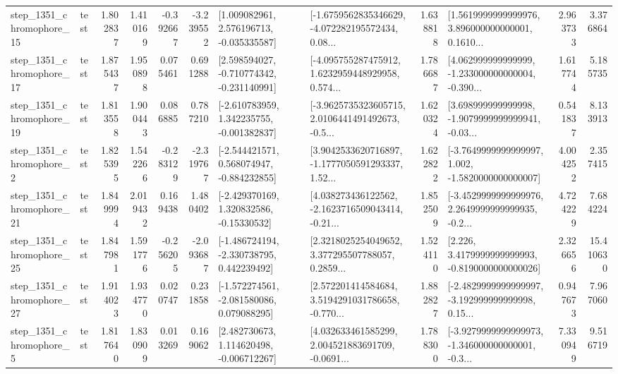 \begin{tabular}{llrrrrllrlrr}
 step\_1351\_chromophore\_15 &      test &      1.802837 &    1.410169 &     -0.392667 & -3.239552 &    [1.009082961, 2.576196713, -0.035335587] &  [-1.6759562835346629, -4.072282195572434, 0.08... &       1.638818 &  [1.5619999999999976, 3.896000000000001, 0.1610... &            2.963733 &          3.376864 \\
 step\_1351\_chromophore\_17 &      test &      1.875437 &    1.950898 &      0.075461 &  0.691288 &   [2.598594027, -0.710774342, -0.231140991] &  [-4.095755287475912, 1.6232959448929958, 0.574... &       1.786687 &  [4.062999999999999, -1.233000000000004, -0.390... &            1.617744 &          5.185735 \\
 step\_1351\_chromophore\_19 &      test &      1.813558 &    1.900443 &      0.086885 &  0.787210 &   [-2.610783959, 1.342235755, -0.001382837] &  [-3.9625735323605715, 2.0106441491492673, -0.5... &       1.620324 &  [3.698999999999998, -1.9079999999999941, -0.03... &            0.541837 &          8.133913 \\
  step\_1351\_chromophore\_2 &      test &      1.825395 &    1.542266 &     -0.283129 & -2.319767 &   [-2.544421571, 0.568074947, -0.884232855] &  [3.9042533620716897, -1.1777050591293337, 1.52... &       1.622822 &  [-3.7649999999999997, 1.002, -1.5820000000000007] &            4.004252 &          2.357415 \\
 step\_1351\_chromophore\_21 &      test &      1.849994 &    2.019432 &      0.169438 &  1.480402 &    [-2.429370169, 1.320832586, -0.15330532] &  [4.038273436122562, -2.1623716509043414, -0.21... &       1.852509 &  [-3.4529999999999976, 2.2649999999999935, -0.2... &            4.724229 &          7.684224 \\
 step\_1351\_chromophore\_25 &      test &      1.847981 &    1.591776 &     -0.256205 & -2.093687 &   [-1.486724194, -2.330738795, 0.442239492] &  [2.3218025254049652, 3.377295507788057, 0.2859... &       1.524110 &   [2.226, 3.4179999999999993, -0.8190000000000026] &            2.326656 &         15.410630 \\
 step\_1351\_chromophore\_27 &      test &      1.914023 &    1.934770 &      0.020747 &  0.231858 &   [-1.572274561, -2.081580086, 0.079088295] &  [2.572201414584684, 3.5194291031786658, -0.770... &       1.882827 &  [-2.4829999999999997, -3.192999999999998, 0.15... &            0.947673 &          7.967060 \\
  step\_1351\_chromophore\_5 &      test &      1.817640 &    1.830909 &      0.013269 &  0.169062 &    [2.482730673, 1.114620498, -0.006712267] &  [4.032633461585299, 2.004521883691709, -0.0691... &       1.788300 &  [-3.9279999999999973, -1.346000000000001, -0.3... &            7.330949 &          9.516719 \\

\end{tabular}
